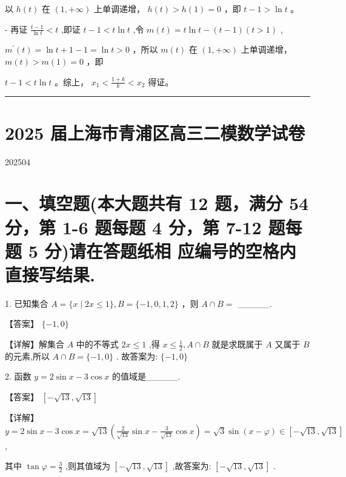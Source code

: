 \documentclass[10pt]{article}
\newcommand{\HRule}{\begin{center}\rule{0.9\linewidth}{0.2mm}\end{center}}
\begin{document}
\hspace*{3em} 以 \(h\left( t\right)\) 在 \(\left( {1, + \infty }\right)\) 上单调递增， \(h\left( t\right)  > h\left( 1\right)  = 0\) ，即 \(t - 1 > \ln t\) 。

\hspace*{1em} - 再证 \(\frac{t - 1}{\ln t} < t\) ,即证 \(t - 1 < t\ln t\) ,令 \(m\left( t\right)  = t\ln t - \left( {t - 1}\right) \left( {t > 1}\right)\) ,

\hspace*{3em} \({m}^{\prime }\left( t\right)  = \ln t + 1 - 1 = \ln t > 0\) ，所以 \(m\left( t\right)\) 在 \(\left( {1, + \infty }\right)\) 上单调递增， \(m\left( t\right)  > m\left( 1\right)  = 0\) ，即

\hspace*{3em} \(t - 1 < t\ln t\) 。综上， \({x}_{1} < \frac{1 + k}{k} < {x}_{2}\) 得证。

\HRule

\section*{2025 届上海市青浦区高三二模数学试卷}

202504

\section*{一、填空题(本大题共有 12 题，满分 54 分，第 1-6 题每题 4 分，第 7-12 题每题 5 分)请在答题纸相 应编号的空格内直接写结果.}

1. 已知集合 \(A = \{ x \mid  {2x} \leq  1\} ,B = \{  - 1,0,1,2\}\) ，则 \(A \cap  B =\) \_\_\_\_\_.

【答案】 \(\{  - 1,0\}\)

【详解】解集合 \(A\) 中的不等式 \({2x} \leq  1\) ,得 \(x \leq  \frac{1}{2},A \cap  B\) 就是求既属于 \(A\) 又属于 \(B\) 的元素,所以 \(A \cap  B = \{  - 1,0\}\) . 故答案为: \(\{  - 1,0\}\)

2. 函数 \(y = 2\sin x - 3\cos x\) 的值域是\_\_\_\_\_.

【答案】 \(\left\lbrack  {-\sqrt{13},\sqrt{13}}\right\rbrack\)

【详解】 \(y = 2\sin x - 3\cos x = \sqrt{13}\left( {\frac{2}{\sqrt{13}}\sin x - \frac{3}{\sqrt{13}}\cos x}\right)  = \sqrt{3}\sin \left( {x - \varphi }\right)  \in  \left\lbrack  {-\sqrt{13},\sqrt{13}}\right\rbrack\) ,

其中 \(\tan \varphi  = \frac{3}{2}\) ,则其值域为 \(\left\lbrack  {-\sqrt{13},\sqrt{13}}\right\rbrack\) ,故答案为: \(\left\lbrack  {-\sqrt{13},\sqrt{13}}\right\rbrack\) .
\end{document}

